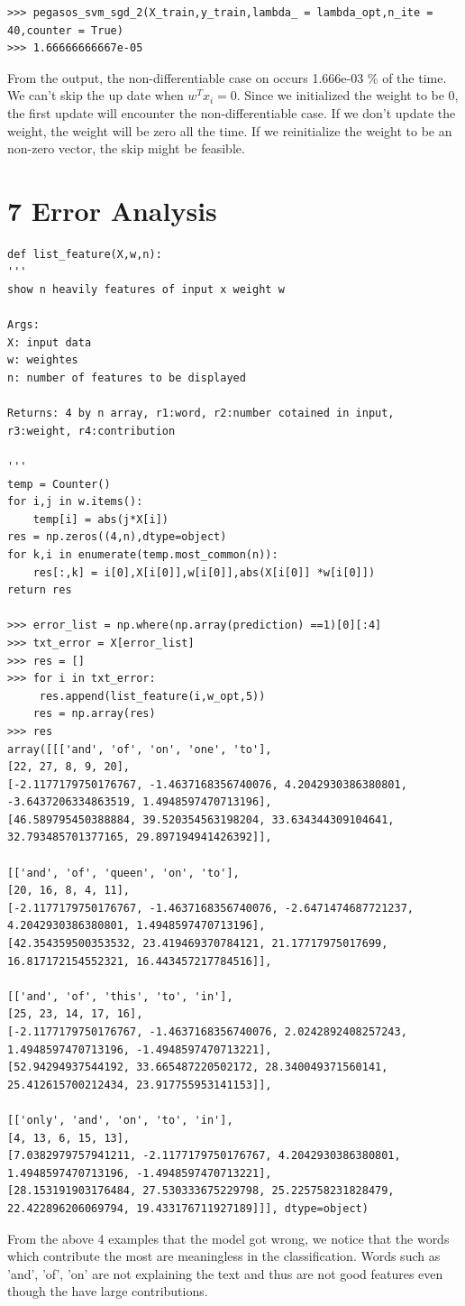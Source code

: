 \documentclass{article}
\begin{document}
\begin{verbatim}
>>> pegasos_svm_sgd_2(X_train,y_train,lambda_ = lambda_opt,n_ite = 40,counter = True)
>>> 1.66666666667e-05
\end{verbatim} 

From the output, the non-differentiable case on occurs 1.666e-03 \% of the time. We can't skip the up date when $w^Tx_i = 0$. Since we initialized the weight to be 0, the first update will encounter the non-differentiable case. If we don't update the weight, the weight will be zero all the time. If we reinitialize the weight to be an non-zero vector, the skip might be feasible. 

\section{7 Error Analysis}

\begin{verbatim}
def list_feature(X,w,n):
'''
show n heavily features of input x weight w

Args:
X: input data
w: weightes
n: number of features to be displayed

Returns: 4 by n array, r1:word, r2:number cotained in input, r3:weight, r4:contribution

'''
temp = Counter()
for i,j in w.items():
	temp[i] = abs(j*X[i])
res = np.zeros((4,n),dtype=object)
for k,i in enumerate(temp.most_common(n)):
	res[:,k] = i[0],X[i[0]],w[i[0]],abs(X[i[0]] *w[i[0]])
return res

>>> error_list = np.where(np.array(prediction) ==1)[0][:4]
>>> txt_error = X[error_list]
>>> res = []
>>> for i in txt_error:
   	 res.append(list_feature(i,w_opt,5))
    res = np.array(res)
>>> res
array([[['and', 'of', 'on', 'one', 'to'],
[22, 27, 8, 9, 20],
[-2.1177179750176767, -1.4637168356740076, 4.2042930386380801,
-3.6437206334863519, 1.4948597470713196],
[46.589795450388884, 39.520354563198204, 33.634344309104641,
32.793485701377165, 29.897194941426392]],

[['and', 'of', 'queen', 'on', 'to'],
[20, 16, 8, 4, 11],
[-2.1177179750176767, -1.4637168356740076, -2.6471474687721237,
4.2042930386380801, 1.4948597470713196],
[42.354359500353532, 23.419469370784121, 21.17717975017699,
16.817172154552321, 16.443457217784516]],

[['and', 'of', 'this', 'to', 'in'],
[25, 23, 14, 17, 16],
[-2.1177179750176767, -1.4637168356740076, 2.0242892408257243,
1.4948597470713196, -1.4948597470713221],
[52.94294937544192, 33.665487220502172, 28.340049371560141,
25.412615700212434, 23.917755953141153]],

[['only', 'and', 'on', 'to', 'in'],
[4, 13, 6, 15, 13],
[7.0382979757941211, -2.1177179750176767, 4.2042930386380801,
1.4948597470713196, -1.4948597470713221],
[28.153191903176484, 27.530333675229798, 25.225758231828479,
22.422896206069794, 19.433176711927189]]], dtype=object)
\end{verbatim}

From the above 4 examples that the model got wrong, we notice that the words which contribute the most are meaningless in the classification. Words such as 'and', 'of', 'on' are not explaining the text and thus are not good features even though the have large contributions. 
\end{document}
